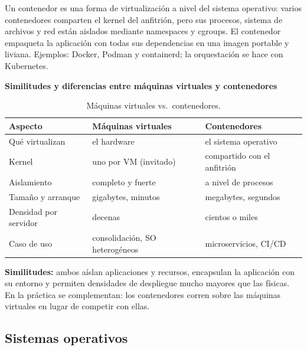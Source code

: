 \documentclass[11pt,a4paper]{report}
\begin{document}
Un contenedor es una forma de virtualización a nivel del sistema operativo: varios contenedores comparten el kernel del anfitrión, pero sus procesos, sistema de archivos y red están aislados mediante namespaces y cgroups. El contenedor empaqueta la aplicación con todas sus dependencias en una imagen portable y liviana. Ejemplos: Docker, Podman y containerd; la orquestación se hace con Kubernetes.

\textbf{Similitudes y diferencias entre máquinas virtuales y contenedores}

\begin{table}[H]
  \centering
  \begin{tabular}{@{}lll@{}}
    \toprule
    \textbf{Aspecto} & \textbf{Máquinas virtuales} & \textbf{Contenedores} \\
    \midrule
    Qué virtualizan & el hardware & el sistema operativo \\
    Kernel & uno por VM (invitado) & compartido con el anfitrión \\
    Aislamiento & completo y fuerte & a nivel de procesos \\
    Tamaño y arranque & gigabytes, minutos & megabytes, segundos \\
    Densidad por servidor & decenas & cientos o miles \\
    Caso de uso & consolidación, SO heterogéneos & microservicios, CI/CD \\
    \bottomrule
  \end{tabular}
  \caption{Máquinas virtuales vs.\ contenedores.}
  \label{tab:vm-vs-contenedores}
\end{table}

\textbf{Similitudes:} ambos aíslan aplicaciones y recursos, encapsulan la aplicación con su entorno y permiten densidades de despliegue mucho mayores que las físicas. En la práctica se complementan: los contenedores corren sobre las máquinas virtuales en lugar de competir con ellas.

\subsection{Sistemas operativos}
\end{document}
